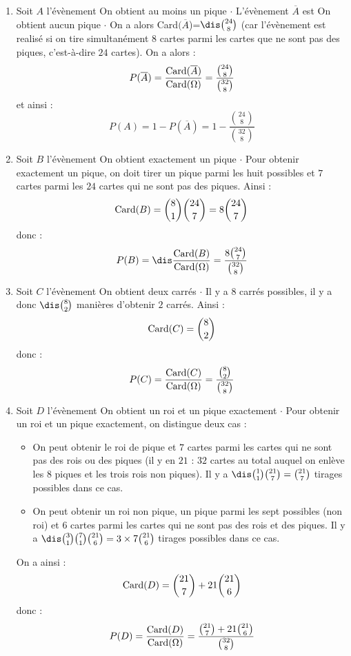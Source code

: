 \documentclass[a4paper,10pt]{report}
\begin{document}
\begin{enumerate}
\item Soit $A$ l'évènement \og On obtient au moins un pique \fg$\cdot$ L'évènement $\overline{A}$ est \og On obtient aucun pique \fg $\cdot$ On a alors Card$(\overline{A}$)=$\dis \binom{24}{8}$ (car l'évènement est realisé si on tire simultanément $8$ cartes parmi les cartes que ne sont pas des piques, c'est-à-dire $24$ cartes). On a alors :
\[ P(\overline{A}) = \frac{\hbox{Card}(\overline{A})}{\hbox{Card}(\Omega)} = \frac{\binom{24}{8}}{\binom{32}{8}}\]
et ainsi :
\[ P(A) = 1 - P(\overline{A}) = 1 - \frac{\binom{24}{8}}{\binom{32}{8}}  \]

\item Soit $B$ l'évènement \og On obtient exactement un pique \fg$\cdot$ Pour obtenir exactement un pique, on doit tirer un pique parmi les huit possibles et $7$ cartes parmi les $24$ cartes qui ne sont pas des piques. Ainsi :
\[ \hbox{Card}(B) = \binom{8}{1} \binom{24}{7} = 8 \binom{24}{7} \]
donc :
\[ P(B) = \dis \frac{\hbox{Card}(B)}{\hbox{Card}(\Omega)} = \frac{8\binom{24}{7}}{\binom{32}{8}} \]

\item Soit $C$ l'évènement \og On obtient deux carrés \fg$\cdot$ Il y a $8$ carrés possibles, il y a donc $\dis \binom{8}{2}$ manières d'obtenir $2$ carrés. Ainsi :
\[ \hbox{Card}(C) = \binom{8}{2} \]
donc :
\[ P(C)= \frac{\hbox{Card}(C)}{\hbox{Card}(\Omega)} = \frac{\binom{8}{2}}{\binom{32}{8}}\]

\item Soit $D$ l'évènement \og On obtient un roi et un pique exactement \fg$\cdot$ Pour obtenir un roi et un pique exactement, on distingue deux cas :
\begin{itemize}
\item On peut obtenir le roi de pique et $7$ cartes parmi les cartes qui ne sont pas des rois ou des piques (il y en $21$ : $32$ cartes au total auquel on enlève les $8$ piques et les trois rois non piques). Il y a $\dis \binom{1}{1}\binom{21}{7}=\binom{21}{7}$ tirages possibles dans ce cas.
\item On peut obtenir un roi non pique, un pique parmi les sept possibles (non roi) et $6$ cartes parmi les cartes qui ne sont pas des rois et des piques. Il y a $\dis \binom{3}{1} \binom{7}{1} \binom{21}{6}= 3 \times 7  \binom{21}{6}$ tirages possibles dans ce cas.
\end{itemize}
On a ainsi :
\[ \hbox{Card}(D) = \binom{21}{7} + 21 \binom{21}{6}\]
donc :
\[  P(D)= \frac{\hbox{Card}(D)}{\hbox{Card}(\Omega)} = \frac{\binom{21}{7} + 21 \binom{21}{6}}{\binom{32}{8}}\]
\end{enumerate}
\end{document}
